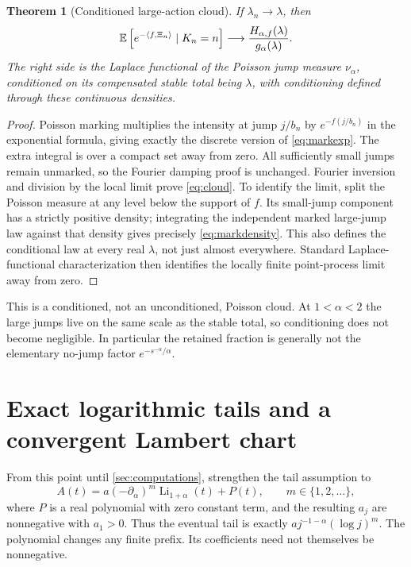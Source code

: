\documentclass[11pt,a4paper]{article}
\numberwithin{equation}{section}
\newtheorem{theorem}{Theorem}[section]
\theoremstyle{definition}\newtheorem{definition}[theorem]{Definition}
\theoremstyle{remark}\newtheorem{remark}[theorem]{Remark}
\theoremstyle{definition}
\DeclareMathOperator{\Li}{Li}
\begin{document}
\begin{theorem}[Conditioned large-action cloud]\label{thm:cloud}
If $\lambda_n\to\lambda$, then
\begin{equation}\label{eq:cloud}
 \mathbb E\left[e^{-\langle f,\Xi_n\rangle}\mid K_n=n\right]
 \longrightarrow\frac{H_{\alpha,f}(\lambda)}{g_\alpha(\lambda)}.
\end{equation}
The right side is the Laplace functional of the Poisson jump measure
$\nu_\alpha$, conditioned on its compensated stable total being $\lambda$,
with conditioning defined through these continuous densities.
\end{theorem}
\begin{proof}
Poisson marking multiplies the intensity at jump $j/b_n$ by
$e^{-f(j/b_n)}$ in the exponential formula, giving exactly the discrete
version of \eqref{eq:markexp}. The extra integral is over a compact set away
from zero. All sufficiently small jumps remain unmarked, so the Fourier
damping proof is unchanged. Fourier inversion and division by the local
limit prove \eqref{eq:cloud}. To identify the limit, split the Poisson
measure at any level below the support of $f$. Its small-jump component
has a strictly positive density; integrating the independent marked
large-jump law against that density gives precisely \eqref{eq:markdensity}.
This also defines the conditional law at every real $\lambda$, not just
almost everywhere. Standard Laplace-functional characterization then
identifies the locally finite point-process limit away from zero.
\end{proof}

This is a conditioned, not an unconditioned, Poisson cloud. At $1<\alpha<2$
the large jumps live on the same scale as the stable total, so conditioning
does not become negligible. In particular the retained fraction is generally
not the elementary no-jump factor $e^{-s^{-\alpha}/\alpha}$.

\section{Exact logarithmic tails and a convergent Lambert chart}
\label{sec:chart}

From this point until \cref{sec:computations}, strengthen the tail assumption
to
\begin{equation}\label{eq:logmodel}
 A(t)=a(-\partial_\alpha)^m\Li_{1+\alpha}(t)+P(t),
 \qquad m\in\{1,2,\ldots\},
\end{equation}
where $P$ is a real polynomial with zero constant term, and the resulting
$a_j$ are nonnegative with $a_1>0$. Thus the eventual tail is exactly
$a j^{-1-\alpha}(\log j)^m$. The polynomial changes any finite prefix.
Its coefficients need not themselves be nonnegative.
\end{document}
